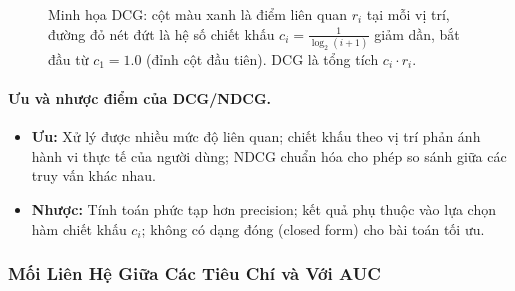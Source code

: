 \begin{figure}[H]
\caption{Minh họa DCG: cột màu xanh là điểm liên quan $r_i$ tại mỗi vị trí,
đường đỏ nét đứt là hệ số chiết khấu $c_i = \frac{1}{\log_2(i+1)}$ giảm dần,
bắt đầu từ $c_1 = 1.0$ (đỉnh cột đầu tiên). DCG là tổng tích $c_i \cdot r_i$.}
\label{fig:dcg_visual}
\end{figure}

\paragraph{Ưu và nhược điểm của DCG/NDCG.}
\begin{itemize}
    \item \textbf{Ưu:} Xử lý được nhiều mức độ liên quan; chiết khấu theo vị trí phản ánh hành vi thực tế của người dùng; NDCG chuẩn hóa cho phép so sánh giữa các truy vấn khác nhau.
    \item \textbf{Nhược:} Tính toán phức tạp hơn precision; kết quả phụ thuộc vào lựa chọn hàm chiết khấu $c_i$; không có dạng đóng (closed form) cho bài toán tối ưu.
\end{itemize}

\subsubsection{Mối Liên Hệ Giữa Các Tiêu Chí và Với AUC}
\label{sec:criteria_connections}

